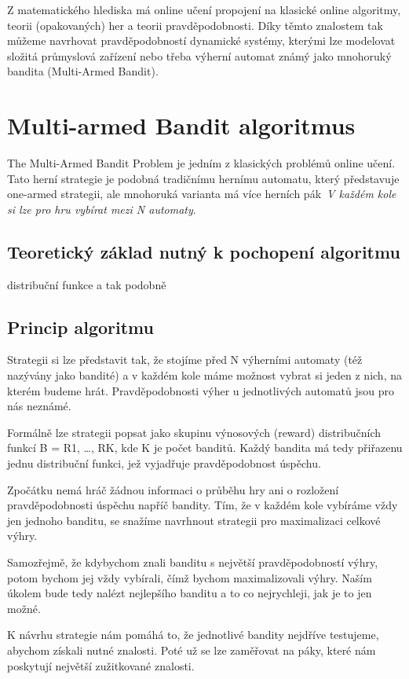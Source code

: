 \documentclass[thesis=M,czech]{FITthesis}[2014/05/07]
\begin{document}
Z matematického hlediska má online učení propojení na klasické online algoritmy, teorii (opakovaných) her a teorii pravděpodobnosti. Díky těmto znalostem tak můžeme navrhovat pravděpodobností dynamické systémy, kterými lze modelovat složitá průmyslová zařízení nebo třeba výherní automat známý jako mnohoruký bandita (Multi-Armed Bandit).

\section{Multi-armed Bandit algoritmus}
The Multi-Armed Bandit Problem je jedním z klasických problémů online učení. Tato herní strategie je podobná tradičnímu hernímu automatu, který představuje one-armed strategii, ale mnohoruká varianta má více herních pák~\emph{V každém kole si lze pro hru vybírat mezi N automaty}. 

\subsection{Teoretický základ nutný k pochopení algoritmu}

distribuční funkce a tak podobně

\subsection{Princip algoritmu}
Strategii si lze představit tak, že stojíme před N výherními automaty (též nazývány jako bandité) a v každém kole máme možnost vybrat si jeden z nich, na kterém budeme hrát. Pravděpodobnosti výher u jednotlivých automatů jsou pro nás neznámé. 

Formálně lze strategii popsat jako skupinu výnosových (reward) distribučních funkcí B = {R1, …, RK}, kde K je počet banditů. Každý bandita má tedy přiřazenu jednu distribuční funkci, jež vyjadřuje pravděpodobnost úspěchu. 

Zpočátku nemá hráč žádnou informaci o průběhu hry ani o rozložení pravděpodobnosti úspěchu napříč bandity. Tím, že v každém kole vybíráme vždy jen jednoho banditu, se snažíme navrhnout strategii pro maximalizaci celkové výhry.

Samozřejmě, že kdybychom znali banditu s největší pravděpodobností výhry, potom bychom jej vždy vybírali, čímž bychom maximalizovali výhry. Naším úkolem bude tedy nalézt nejlepšího banditu a to co nejrychleji, jak je to jen možné.

K návrhu strategie nám pomáhá to, že jednotlivé bandity nejdříve testujeme, abychom získali nutné znalosti. Poté už se lze zaměřovat na páky, které nám poskytují největší zužitkované znalosti. 
\end{document}
